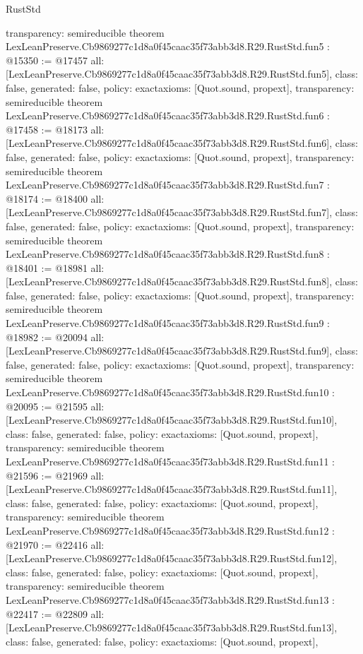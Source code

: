 \begin{lexlean}{RustStd}
\begin{coremodule}
{  transparency: semireducible
}
theorem LexLeanPreserve.Cb9869277c1d8a0f45caac35f73abb3d8.R29.RustStd.fun5 : @15350 := @17457 {
  all: [LexLeanPreserve.Cb9869277c1d8a0f45caac35f73abb3d8.R29.RustStd.fun5],
  class: false,
  generated: false,
  policy: exact{axioms: [Quot.sound, propext]},
  transparency: semireducible
}
theorem LexLeanPreserve.Cb9869277c1d8a0f45caac35f73abb3d8.R29.RustStd.fun6 : @17458 := @18173 {
  all: [LexLeanPreserve.Cb9869277c1d8a0f45caac35f73abb3d8.R29.RustStd.fun6],
  class: false,
  generated: false,
  policy: exact{axioms: [Quot.sound, propext]},
  transparency: semireducible
}
theorem LexLeanPreserve.Cb9869277c1d8a0f45caac35f73abb3d8.R29.RustStd.fun7 : @18174 := @18400 {
  all: [LexLeanPreserve.Cb9869277c1d8a0f45caac35f73abb3d8.R29.RustStd.fun7],
  class: false,
  generated: false,
  policy: exact{axioms: [Quot.sound, propext]},
  transparency: semireducible
}
theorem LexLeanPreserve.Cb9869277c1d8a0f45caac35f73abb3d8.R29.RustStd.fun8 : @18401 := @18981 {
  all: [LexLeanPreserve.Cb9869277c1d8a0f45caac35f73abb3d8.R29.RustStd.fun8],
  class: false,
  generated: false,
  policy: exact{axioms: [Quot.sound, propext]},
  transparency: semireducible
}
theorem LexLeanPreserve.Cb9869277c1d8a0f45caac35f73abb3d8.R29.RustStd.fun9 : @18982 := @20094 {
  all: [LexLeanPreserve.Cb9869277c1d8a0f45caac35f73abb3d8.R29.RustStd.fun9],
  class: false,
  generated: false,
  policy: exact{axioms: [Quot.sound, propext]},
  transparency: semireducible
}
theorem LexLeanPreserve.Cb9869277c1d8a0f45caac35f73abb3d8.R29.RustStd.fun10 : @20095 := @21595 {
  all: [LexLeanPreserve.Cb9869277c1d8a0f45caac35f73abb3d8.R29.RustStd.fun10],
  class: false,
  generated: false,
  policy: exact{axioms: [Quot.sound, propext]},
  transparency: semireducible
}
theorem LexLeanPreserve.Cb9869277c1d8a0f45caac35f73abb3d8.R29.RustStd.fun11 : @21596 := @21969 {
  all: [LexLeanPreserve.Cb9869277c1d8a0f45caac35f73abb3d8.R29.RustStd.fun11],
  class: false,
  generated: false,
  policy: exact{axioms: [Quot.sound, propext]},
  transparency: semireducible
}
theorem LexLeanPreserve.Cb9869277c1d8a0f45caac35f73abb3d8.R29.RustStd.fun12 : @21970 := @22416 {
  all: [LexLeanPreserve.Cb9869277c1d8a0f45caac35f73abb3d8.R29.RustStd.fun12],
  class: false,
  generated: false,
  policy: exact{axioms: [Quot.sound, propext]},
  transparency: semireducible
}
theorem LexLeanPreserve.Cb9869277c1d8a0f45caac35f73abb3d8.R29.RustStd.fun13 : @22417 := @22809 {
  all: [LexLeanPreserve.Cb9869277c1d8a0f45caac35f73abb3d8.R29.RustStd.fun13],
  class: false,
  generated: false,
  policy: exact{axioms: [Quot.sound, propext]},
}
\end{coremodule}
\end{lexlean}
